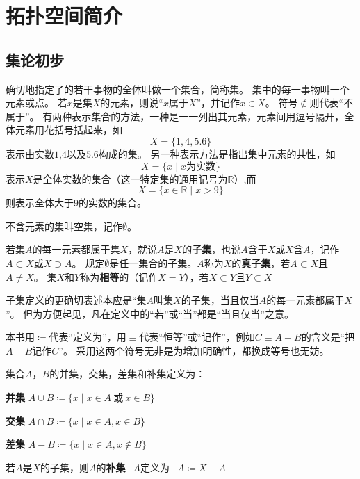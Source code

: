 \chapter{拓扑空间简介}

\section{集论初步}

确切地指定了的若干事物的全体叫做一个集合，简称集。
集中的每一事物叫一个元素或点。
若$x$是集$X$的元素，则说``$x$属于$X$''，并记作$x \in X$。
符号$\notin$则代表``不属于''。
有两种表示集合的方法，一种是一一列出其元素，元素间用逗号隔开，全体元素用花括号括起来，如
$$X = \{1, 4, 5.6\}$$
表示由实数$1$,$4$以及$5.6$构成的集。
另一种表示方法是指出集中元素的共性，如
$$X = \{x \mid \text{$x$为实数}\}$$
表示$X$是全体实数的集合（这一特定集的通用记号为$\mathbb{R}$）,而
$$X = \{x \in \mathbb{R} \mid x > 9\}$$
则表示全体大于$9$的实数的集合。

不含元素的集叫空集，记作$\emptyset$。

\begin{definition}
	若集$A$的每一元素都属于集$X$，就说$A$是$X$的\textbf{子集}，也说$A$含于$X$或$X$含$A$，记作$A \subset X$或$X \supset A$。
	规定$\emptyset$是任一集合的子集。$A$称为$X$的\textbf{真子集}，若$A \subset X$且$A \neq X$。
	集$X$和$Y$称为\textbf{相等}的（记作$X = Y$），若$X \subset Y$且$Y \subset X$
\end{definition}

\begin{note}
	子集定义的更确切表述本应是``集$A$叫集$X$的子集，当且仅当$A$的每一元素都属于$X$''。
	但为方便起见，凡在定义中的``若''或``当''都是``当且仅当''之意。
\end{note}

本书用$\coloneq$代表``定义为''，用$\equiv$代表``恒等''或``记作''，例如$C \equiv A - B$的含义是``把$A - B$记作$C$''。
采用这两个符号无非是为增加明确性，都换成等号也无妨。

\begin{definition}
	集合$A$，$B$的并集，交集，差集和补集定义为：

	\textbf{并集} $A \cup B \coloneq \{x \mid x \in A ~ \text{或} ~ x \in B\}$

	\textbf{交集} $A \cap B \coloneq \{x \mid x \in A, x \in B\}$

	\textbf{差集} $A - B \coloneq \{x \mid x \in A, x \notin B\}$

	若$A$是$X$的子集，则$A$的\textbf{补集}$-A$定义为$-A \coloneq X - A$

\end{definition}

